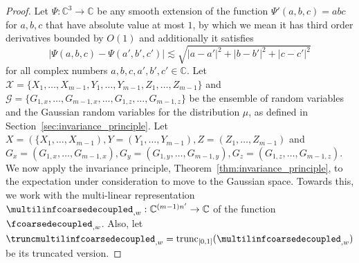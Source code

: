 \documentclass[11pt]{article}
\newcommand\card[1]{\left| {#1} \right|}
\newcommand{\V}[1]{{#1}}
\begin{document}
\begin{proof}
   
   	Let $\Psi\colon \mathbb{C}^3\to\mathbb{C}$ be any smooth extension of the function $\Psi'(a,b,c) = abc$ for $a,b,c$
	that have absolute value at most $1$, by which we mean it has third order derivatives bounded by $O(1)$ and  additionally it satisfies
    $$\card{\Psi(a, b, c) - \Psi(a',b',c')} \lesssim \sqrt{\card{a-a'}^2+\card{b-b'}^2+\card{c-c'}^2}$$
    for all complex numbers $a,b,c,a',b',c'\in \mathbb{C}$. Let $\mathbf{\mathcal{X}} = \{X_{1},\ldots,X_{m-1}, Y_{1}, \ldots, Y_{m-1}, Z_{1},\ldots, Z_{m-1}\}$ and $\mathbf{\mathcal{G}} = \{G_{1,x},\ldots,G_{m-1, x},\ldots, G_{1,z},\ldots,G_{m-1, z}\}$ be the ensemble of random variables and the Gaussian random variables for the distribution $\mu$, as defined in Section~\ref{sec:invariance_principle}. Let $X = (\{X_{1},\ldots,X_{m-1}), Y = (Y_{1}, \ldots, Y_{m-1}), Z=  (Z_{1},\ldots, Z_{m-1})$ and ${G}_x = (G_{1,x},\ldots,G_{m-1, x}),  {G}_y = (G_{1,y},\ldots,G_{m-1, y}), {G}_z=(G_{1,z},\ldots,G_{m-1, z})$. We now apply the invariance principle, Theorem~\ref{thm:invariance_principle}, to the expectation under consideration to move to the Gaussian space. Towards this, we work with the multi-linear representation $\multilinfcoarsedecoupled_{, \V w}: \mathbb{C}^{(m-1)n'}\rightarrow \mathbb{C}$ of the function $\fcoarsedecoupled_{,\V w}$. Also, let $\truncmultilinfcoarsedecoupled_{, \V w} = \mathrm{trunc}_{[0,1]}(\multilinfcoarsedecoupled_{, \V w})$ be its truncated version.


\end{proof}
\end{document}
